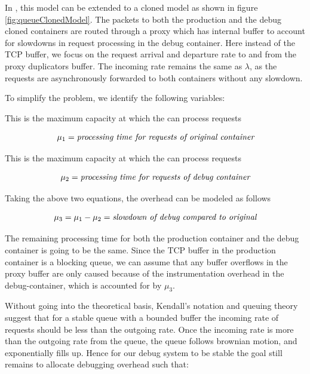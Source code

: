 In \parikshan, this model can be extended to a cloned model as shown in figure \ref{fig:queueClonedModel}.
The packets to both the production and the debug cloned containers are routed through a proxy which has internal buffer to account for slowdowns in request processing in the debug container. 
Here instead of the TCP buffer, we focus on the request arrival and departure rate to and from the proxy duplicators buffer.
The incoming rate remains the same as $\lambda$, as the requests are asynchronously forwarded to both containers without any slowdown. 

To simplify the problem, we identify the following variables:

This is the maximum capacity at which the \productioncontainer can process requests

\begin{equation}\label{eq:1}
\mu_{1} = \emph{processing time for requests of original container}
\end{equation}

This is the maximum capacity at which the \debugcontainer can process requests

\begin{equation}\label{eq:2}
\mu_{2} = \emph{processing time for requests of debug container}
\end{equation}

Taking the above two equations, the overhead can be modeled as follows

\begin{equation}\label{eq:3}
\mu_{3} = \mu_{1} - \mu_{2}  = \emph{slowdown of debug compared to original}
\end{equation}

The remaining processing time for both the production container and the debug container is going to be the same. 
Since the TCP buffer in the production container is a blocking queue, we can assume that any buffer overflows in the proxy buffer are only caused because of the instrumentation overhead in the debug-container, which is accounted for by $\mu_{3}$.

Without going into the theoretical basis, Kendall's notation and queuing theory suggest that for a stable queue with a bounded buffer the incoming rate of requests should be less than the outgoing rate. 
Once the incoming rate is more than the outgoing rate from the queue, the queue follows brownian motion, and exponentially fills up.
Hence for our debug system to be stable the goal still remains to allocate debugging overhead such that:

